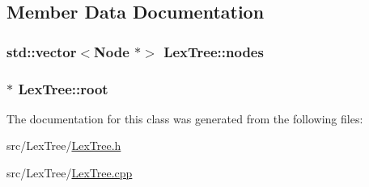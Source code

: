 \subsection{Member Data Documentation}
\hypertarget{class_lex_tree_a21f434a67d532c1f6e30d77b7948aada}{
\subsubsection[{nodes}]{\setlength{\rightskip}{0pt plus 5cm}std\+::vector$<${\bf Node} $\ast$$>$ Lex\+Tree\+::nodes\hspace{0.3cm}{\ttfamily [private]}}}\label{class_lex_tree_a21f434a67d532c1f6e30d77b7948aada}
\hypertarget{class_lex_tree_a8090572ccb237634f3f8483305cf878e}{
\subsubsection[{root}]{$\ast$ Lex\+Tree\+::root\hspace{0.3cm}{\ttfamily [private]}}}\label{class_lex_tree_a8090572ccb237634f3f8483305cf878e}


The documentation for this class was generated from the following files\+:\begin{DoxyCompactItemize}
\item 
src/\+Lex\+Tree/\hyperlink{_lex_tree_8h}{Lex\+Tree.\+h}\item 
src/\+Lex\+Tree/\hyperlink{_lex_tree_8cpp}{Lex\+Tree.\+cpp}\end{DoxyCompactItemize}
